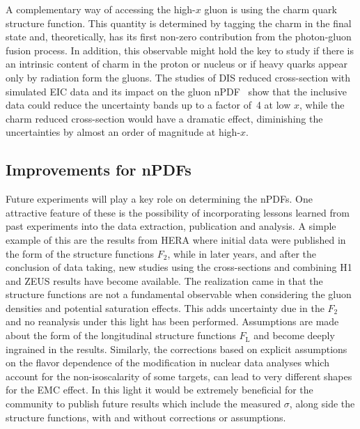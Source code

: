 A complementary way of accessing the high-$x$ gluon is using the charm quark structure function. This quantity is determined by tagging the charm in the final state and, theoretically, has its first non-zero contribution from the photon-gluon fusion process. In addition, this observable might hold the key to study if there is an intrinsic content of charm in the proton or nucleus or if heavy quarks appear only by radiation form the gluons. The studies of DIS reduced cross-section with simulated EIC data and its impact on the gluon nPDF~\cite{PhysRevD.96.114005} show that the inclusive data could reduce the uncertainty bands up to a factor of~4 at low $x$, while the charm reduced cross-section would have a dramatic effect, diminishing the uncertainties by almost an order of magnitude at high-$x$.   

\subsection{Improvements for nPDFs}

Future experiments will play a key role on determining the nPDFs. One attractive feature of these is the possibility of incorporating lessons learned from past experiments into the data extraction, publication and analysis. A simple example of this are the results from HERA where initial data were published in the form of the structure functions $F_{2}$, while in later years, and after the conclusion of data taking, new studies using the cross-sections and combining H1 and ZEUS results have become available. The realization came in that the structure functions are not a fundamental observable when considering the gluon densities and potential saturation effects. This adds uncertainty due in the $F_{2}$ and no reanalysis under this light has been performed.  Assumptions are made about the form of the longitudinal structure functions $F_\mathrm{L}$ and become deeply ingrained in the results.  Similarly, the corrections based on explicit assumptions on the flavor dependence of the modification in nuclear data analyses which account for the non-isoscalarity of some targets, can lead to very different shapes for the EMC effect.  In this light it would be extremely beneficial for the community to publish future results which include  the measured $\sigma$, along side the structure functions, with and without corrections or assumptions. 